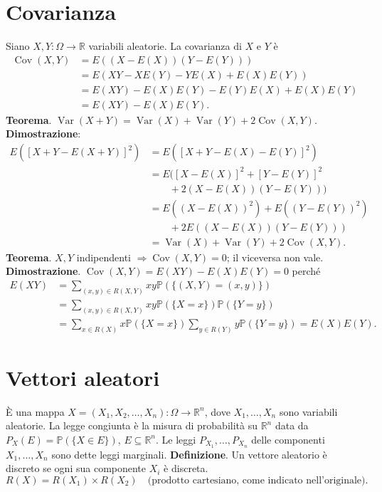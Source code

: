 \documentclass[11pt,a4paper]{article}
\newcommand{\pagina}[1]{\clearpage}
\begin{document}
\section*{Covarianza}
Siano $X,Y:\Omega\to\mathbb R$ variabili aleatorie. La covarianza di $X$ e $Y$ è
\begin{align*}
\operatorname{Cov}(X,Y)&=\boxed{E((X-E(X))(Y-E(Y)))}\\
&=E(XY-XE(Y)-YE(X)+E(X)E(Y))\\
&=E(XY)-E(X)E(Y)-E(Y)E(X)+E(X)E(Y)\\
&=\boxed{E(XY)-E(X)E(Y)}.
\end{align*}
\textbf{Teorema}. $\boxed{\operatorname{Var}(X+Y)=\operatorname{Var}(X)+\operatorname{Var}(Y)+2\operatorname{Cov}(X,Y)}$.
\textbf{Dimostrazione}:
\begin{align*}
E([X+Y-E(X+Y)]^2)&=E([X+Y-E(X)-E(Y)]^2)\\
&=E([X-E(X)]^2+[Y-E(Y)]^2\\
&\qquad+2(X-E(X))(Y-E(Y)))\\
&=E((X-E(X))^2)+E((Y-E(Y))^2)\\
&\qquad+2E((X-E(X))(Y-E(Y)))\\
&=\operatorname{Var}(X)+\operatorname{Var}(Y)+2\operatorname{Cov}(X,Y).
\end{align*}
\textbf{Teorema}. $X,Y$ indipendenti $\Rightarrow\operatorname{Cov}(X,Y)=0$; il viceversa non vale.
\textbf{Dimostrazione}. $\operatorname{Cov}(X,Y)=E(XY)-E(X)E(Y)=0$ perché
\begin{align*}
E(XY)&=\sum_{(x,y)\in R(X,Y)}xy\mathbb P(\{(X,Y)=(x,y)\})\\
&=\sum_{(x,y)\in R(X,Y)}xy\mathbb P(\{X=x\})\mathbb P(\{Y=y\})\\
&=\sum_{x\in R(X)}x\mathbb P(\{X=x\})\sum_{y\in R(Y)}y\mathbb P(\{Y=y\})=E(X)E(Y).
\end{align*}
\pagina{22}\section*{Vettori aleatori}
È una mappa $X=(X_1,X_2,\ldots,X_n):\Omega\to\mathbb R^n$, dove $X_1,\ldots,X_n$ sono variabili aleatorie.
La legge congiunta è la misura di probabilità su $\mathbb R^n$ data da $P_X(E)=\mathbb P(\{X\in E\})$, $E\subseteq\mathbb R^n$.
Le leggi $P_{X_1},\ldots,P_{X_n}$ delle componenti $X_1,\ldots,X_n$ sono dette leggi marginali.
\textbf{Definizione}. Un vettore aleatorio è discreto se ogni sua componente $X_i$ è discreta.
\[R(X)=R(X_1)\times R(X_2)\quad\text{(prodotto cartesiano, come indicato nell'originale)}.\]
\end{document}

